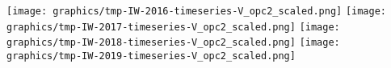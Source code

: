 
\clearpage
\begin{center}
\begin{minipage}{7.0in}
\texttt{[image: graphics/tmp-IW-2016-timeseries-V\_opc2\_scaled.png]}
\quad
\texttt{[image: graphics/tmp-IW-2017-timeseries-V\_opc2\_scaled.png]}
\vskip 1.0cm
\texttt{[image: graphics/tmp-IW-2018-timeseries-V\_opc2\_scaled.png]}
\quad
\texttt{[image: graphics/tmp-IW-2019-timeseries-V\_opc2\_scaled.png]}
\end{minipage}
\end{center}


\renewcommand{\theenumi}{\roman{enumi}}
\renewcommand{\labelenumi}{\textnormal{(\theenumi)}$\;\;$}

